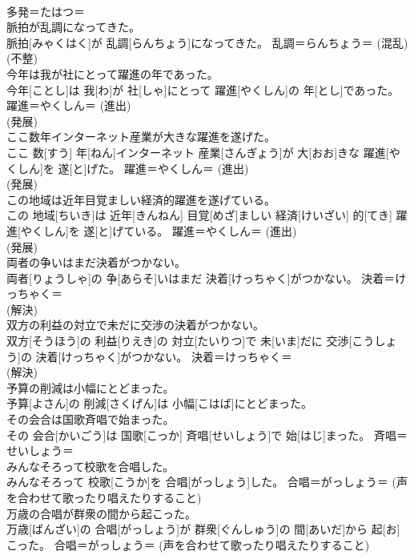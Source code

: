 \documentclass[8pt]{extreport}
\begin{document}
\begin{CJK}{UTF8}{min}
{\\	多発＝たはつ＝ 
\\	脈拍が乱調になってきた。	
\\	脈拍[みゃくはく]が 乱調[らんちょう]になってきた。	乱調＝らんちょう＝ (混乱) 
\\	(不整) 
\\	今年は我が社にとって躍進の年であった。	
\\	今年[ことし]は 我[わ]が 社[しゃ]にとって 躍進[やくしん]の 年[とし]であった。	躍進＝やくしん＝ (進出) 
\\	(発展) 
\\	ここ数年インターネット産業が大きな躍進を遂げた。	
\\	ここ 数[すう] 年[ねん]インターネット 産業[さんぎょう]が 大[おお]きな 躍進[やくしん]を 遂[と]げた。	躍進＝やくしん＝ (進出) 
\\	(発展) 
\\	この地域は近年目覚ましい経済的躍進を遂げている。	
\\	この 地域[ちいき]は 近年[きんねん] 目覚[めざ]ましい 経済[けいざい] 的[てき] 躍進[やくしん]を 遂[と]げている。	躍進＝やくしん＝ (進出) 
\\	(発展) 
\\	両者の争いはまだ決着がつかない。	
\\	両者[りょうしゃ]の 争[あらそ]いはまだ 決着[けっちゃく]がつかない。	決着＝けっちゃく＝ 
\\	(解決) 
\\	双方の利益の対立で未だに交渉の決着がつかない。	
\\	双方[そうほう]の 利益[りえき]の 対立[たいりつ]で 未[いま]だに 交渉[こうしょう]の 決着[けっちゃく]がつかない。	決着＝けっちゃく＝ 
\\	(解決) 
\\	予算の削減は小幅にとどまった。	
\\	予算[よさん]の 削減[さくげん]は 小幅[こはば]にとどまった。	
\\	その会合は国歌斉唱で始まった。	
\\	その 会合[かいごう]は 国歌[こっか] 斉唱[せいしょう]で 始[はじ]まった。	斉唱＝せいしょう＝ 
\\	みんなそろって校歌を合唱した。	
\\	みんなそろって 校歌[こうか]を 合唱[がっしょう]した。	合唱＝がっしょう＝ (声を合わせて歌ったり唱えたりすること) 
\\	万歳の合唱が群衆の間から起こった。	
\\	万歳[ばんざい]の 合唱[がっしょう]が 群衆[ぐんしゅう]の 間[あいだ]から 起[お]こった。	合唱＝がっしょう＝ (声を合わせて歌ったり唱えたりすること) 
}
\end{CJK}
\end{document}
